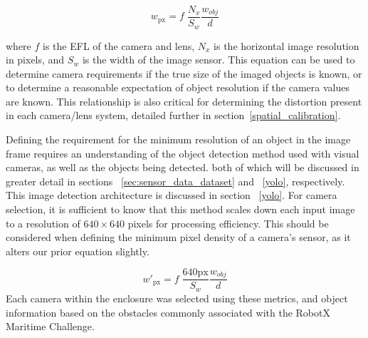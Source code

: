 \documentclass{erauthesis}
\begin{document}
\begin{equation}
\mathit{w}_{\text{px}} = f \; \frac{N_x}{S_w}\frac{\mathit{w}_{obj}}{d}
\end{equation}

where $f$ is the \ac{EFL} of the camera and lens, $N_x$ is the horizontal image resolution in pixels, and $S_w$ is the width of the image sensor.
This equation can be used to determine camera requirements if the true size of the imaged objects is known, or to determine a reasonable expectation of object resolution if the camera values are known.
This relationship is also critical for determining the distortion present in each camera/lens system, detailed further in section~\ref{spatial_calibration}.

Defining the requirement for the minimum resolution of an object in the image frame requires an understanding of the object detection method used with visual cameras, as well as the objects being detected. both of which will be discussed in greater detail in sections ~\ref{sec:sensor_data_dataset} and ~\ref{yolo}, respectively.
This image detection architecture is discussed in section ~\ref{yolo}.
For camera selection, it is sufficient to know that this method scales down each input image to a resolution of $640 \times 640$ pixels for processing efficiency.
This should be considered when defining the minimum pixel density of a camera's sensor, as it alters our prior equation slightly.

\begin{equation}
\mathit{w}'_{\text{px}} = f \; \frac{640 \text{px}}{S_w}\frac{\mathit{w}_{obj}}{d}
\end{equation}
Each camera within the enclosure was selected using these metrics, and object information based on the obstacles commonly associated with the RobotX Maritime Challenge. %
\end{document}
